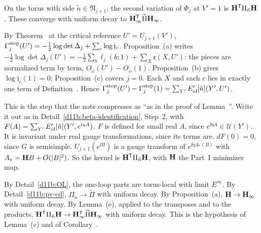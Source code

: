 \begin{detail}\label{d11b:ol-limits}
On the torus with side $\tilde n\in\mathfrak N_{j+1}$, the second variation of $\Phi_j$ at $V'=1$ is $\mathbf H^{\sf T}\Pi_{\tilde n}\mathbf H$. These converge with uniform decay to $\mathbf H_\infty^{\sf T}\widetilde\Pi\mathbf H_\infty$.
\end{detail}

\begin{step}
By Theorem~ at the critical reference $U'=U_{j+1}(V')$, $\Gamma^{\rm step}_j(U')=-\frac12\log\det\Delta_j+\sum_c\log\mathfrak j_c$. Proposition~(a) writes $-\frac12\log\det\Delta_j(U')=-\frac12\sum_b\ell_j(b;1)+\sum_X\mathfrak e(X,U')$: the pieces are normalized term by term, $O_\omega(U')-O_\omega(1)$. Proposition~(b) gives $\log\mathfrak j_c(1)=0$; Proposition~(c) covers $j=0$. Each $X$ and each $c$ lies in exactly one term of Definition~. Hence $\Gamma^{\rm step}_j(U')-\Gamma^{\rm step}_j(1)=\sum_{Y'}E'_{\rm ol}[\tilde n](Y',U')$.
\end{step}

\begin{step}
This is the step that the note compresses as ``as in the proof of Lemma~''. Write it out as in Detail~\ref{d11b:beta-identification}, Step~2, with $F(A)=\sum_{Y'}E'_{\rm ol}[\tilde n](Y',e^{\mathrm i\eta A})$. $F$ is defined for small real $A$, since $e^{\ii\eta A}\in\mathcal U(Y')$. It is invariant under real gauge transformations, since its terms are. $dF(0)=0$, since $G$ is semisimple. $U_{j+1}(e^{\ii B})$ is a gauge transform of $e^{\ii\eta A_*(B)}$ with $A_*=\mathbf H B+O(|B|^2)$. So the kernel is $\mathbf H^{\sf T}\Pi_{\tilde n}\mathbf H$, with $\mathbf H$ the Part~I minimizer map.
\end{step}

\begin{step}[Convergence]
By Detail~\ref{d11b:OL}, the one-loop parts are torus-local with limit $E^\infty$. By Detail~\ref{d11b:pv-cd}, $\Pi_{\tilde n}\to\widetilde\Pi$ with uniform decay. By Proposition~(a), $\mathbf H\to\mathbf H_\infty$ with uniform decay. By Lemma~(e), applied to the transposes and to the products, $\mathbf H^{\sf T}\Pi_{\tilde n}\mathbf H\to\mathbf H_\infty^{\sf T}\widetilde\Pi\mathbf H_\infty$ with uniform decay. This is the hypothesis of Lemma~(c) and of Corollary~.
\end{step}

